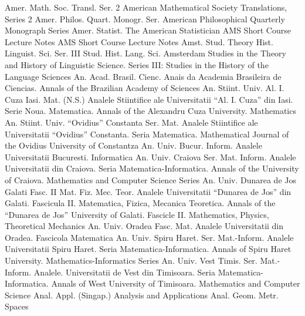 {Amer. Math. Soc. Transl. Ser. 2}
{American Mathematical Society Translations, Series 2}
{Amer. Philos. Quart. Monogr. Ser.}
{American Philosophical Quarterly Monograph Series}
{Amer. Statist.}
{The American Statistician}
{AMS Short Course Lecture Notes}
{AMS Short Course Lecture Notes}
{Amst. Stud. Theory Hist. Linguist. Sci. Ser. III Stud. Hist. Lang. Sci.}
{Amsterdam Studies in the Theory and History of Linguistic Science. Series III: Studies in the History of the Language Sciences}
{An. Acad. Brasil. Cienc.}
{Anais da Academia Brasileira de Ciencias. Annals of the Brazilian Academy of Sciences}
{An. Stiint. Univ. Al. I. Cuza Iasi. Mat. (N.S.)}
{Analele Stiintifice ale Universitatii ``Al. I. Cuza'' din Iasi. Serie Noua. Matematica. Annals of the Alexandru Cuza University. Mathematics}
{An. Stiint. Univ. ``Ovidius'' Constanta Ser. Mat.}
{Analele Stiintifice ale Universitatii ``Ovidius'' Constanta. Seria Matematica. Mathematical Journal of the Ovidius University of Constantza}
{An. Univ. Bucur. Inform.}
{Analele Universitatii Bucuresti. Informatica}
{An. Univ. Craiova Ser. Mat. Inform.}
{Analele Universitatii din Craiova. Seria Matematica-Informatica. Annals of the University of Craiova. Mathematics and Computer Science Series}
{An. Univ. Dunarea de Jos Galati Fasc. II Mat. Fiz. Mec. Teor.}
{Analele Universitatii ``Dunarea de Jos'' din Galati. Fascicula II. Matematica, Fizica, Mecanica Teoretica. Annals of the ``Dunarea de Jos'' University of Galati. Fascicle II. Mathematics, Physics, Theoretical Mechanics}
{An. Univ. Oradea Fasc. Mat.}
{Analele Universitatii din Oradea. Fascicola Matematica}
{An. Univ. Spiru Haret. Ser. Mat.-Inform.}
{Analele Universitatii Spiru Haret. Seria Matematica-Informatica. Annals of Spiru Haret University. Mathematics-Informatics Series}
{An. Univ. Vest Timis. Ser. Mat.-Inform.}
{Analele. Universitatii de Vest din Timisoara. Seria Matematica-Informatica. Annals of West University of Timisoara. Mathematics and Computer Science}
{Anal. Appl. (Singap.)}
{Analysis and Applications}
{Anal. Geom. Metr. Spaces}
